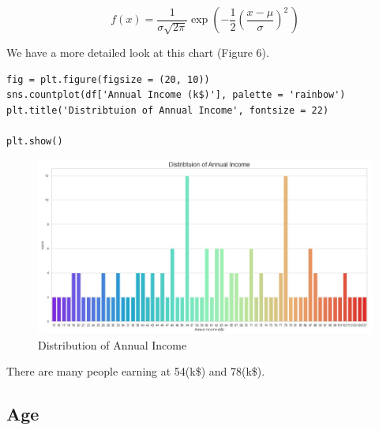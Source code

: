 \documentclass{article}
\begin{document}
\begin{displaymath}
f(x) = \frac{1}{\sigma\sqrt{2\pi}} 
  \exp\left( -\frac{1}{2}\left(\frac{x-\mu}{\sigma}\right)^{\!2}\,\right)
\end{displaymath}

We have a more detailed look at this chart (Figure 6).
\begin{lstlisting}
fig = plt.figure(figsize = (20, 10))
sns.countplot(df['Annual Income (k$)'], palette = 'rainbow')
plt.title('Distribtuion of Annual Income', fontsize = 22)

plt.show()
\end{lstlisting}
\begin{figure}[htp]
    \centering
    \includegraphics[width=18cm]{Distribution of Annual Income (1).jpg}
    \caption{Distribution of Annual Income}
    \label{fig:Distribution of Annual Income}
\end{figure}

There are many people earning at 54(k\$) and 78(k\$).  

\subsection{Age}
\end{document}
